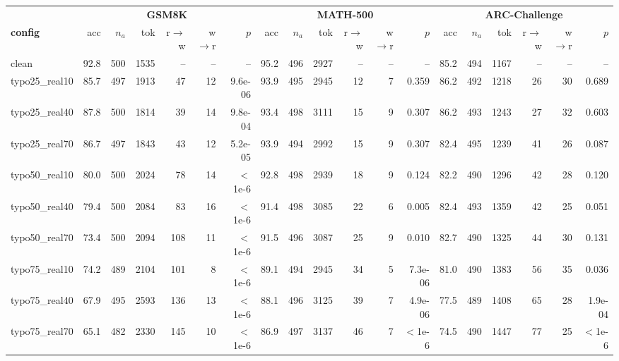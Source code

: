 \begin{tabular}{l rrrrrr rrrrrr rrrrrr}
\toprule
& \multicolumn{6}{c}{\textbf{GSM8K}} & \multicolumn{6}{c}{\textbf{MATH-500}} & \multicolumn{6}{c}{\textbf{ARC-Challenge}} \\
\cmidrule(lr){2-7}\cmidrule(lr){8-13}\cmidrule(lr){14-19}
\textbf{config} & acc & $n_a$ & tok & r$\to$w & w$\to$r & $p$ & acc & $n_a$ & tok & r$\to$w & w$\to$r & $p$ & acc & $n_a$ & tok & r$\to$w & w$\to$r & $p$ \\
\midrule
clean & 92.8 & 500 & 1535 & -- & -- & -- & 95.2 & 496 & 2927 & -- & -- & -- & 85.2 & 494 & 1167 & -- & -- & -- \\
typo25\_real10 & 85.7 & 497 & 1913 & 47 & 12 & 9.6e-06 & 93.9 & 495 & 2945 & 12 & 7 & 0.359 & 86.2 & 492 & 1218 & 26 & 30 & 0.689 \\
typo25\_real40 & 87.8 & 500 & 1814 & 39 & 14 & 9.8e-04 & 93.4 & 498 & 3111 & 15 & 9 & 0.307 & 86.2 & 493 & 1243 & 27 & 32 & 0.603 \\
typo25\_real70 & 86.7 & 497 & 1843 & 43 & 12 & 5.2e-05 & 93.9 & 494 & 2992 & 15 & 9 & 0.307 & 82.4 & 495 & 1239 & 41 & 26 & 0.087 \\
typo50\_real10 & 80.0 & 500 & 2024 & 78 & 14 & $<$1e-6 & 92.8 & 498 & 2939 & 18 & 9 & 0.124 & 82.2 & 490 & 1296 & 42 & 28 & 0.120 \\
typo50\_real40 & 79.4 & 500 & 2084 & 83 & 16 & $<$1e-6 & 91.4 & 498 & 3085 & 22 & 6 & 0.005 & 82.4 & 493 & 1359 & 42 & 25 & 0.051 \\
typo50\_real70 & 73.4 & 500 & 2094 & 108 & 11 & $<$1e-6 & 91.5 & 496 & 3087 & 25 & 9 & 0.010 & 82.7 & 490 & 1325 & 44 & 30 & 0.131 \\
typo75\_real10 & 74.2 & 489 & 2104 & 101 & 8 & $<$1e-6 & 89.1 & 494 & 2945 & 34 & 5 & 7.3e-06 & 81.0 & 490 & 1383 & 56 & 35 & 0.036 \\
typo75\_real40 & 67.9 & 495 & 2593 & 136 & 13 & $<$1e-6 & 88.1 & 496 & 3125 & 39 & 7 & 4.9e-06 & 77.5 & 489 & 1408 & 65 & 28 & 1.9e-04 \\
typo75\_real70 & 65.1 & 482 & 2330 & 145 & 10 & $<$1e-6 & 86.9 & 497 & 3137 & 46 & 7 & $<$1e-6 & 74.5 & 490 & 1447 & 77 & 25 & $<$1e-6 \\
\bottomrule
\end{tabular}
